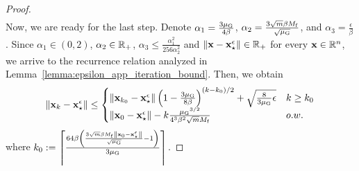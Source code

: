 \begin{proof}
\begin{align*}
\end{align*}
Now, we are ready for the last step. Denote $\alpha_1 = \frac{3{\mu_{\mathrm{G}}}}{4\beta}$, $\alpha_2 = \frac{3\sqrt{m}\beta M_{\mathrm{f}}}{\sqrt{{\mu_{\mathrm{G}}}}}$, and $\alpha_3 = \frac{\epsilon}{\beta}$. Since $\alpha_1 \in (0,2)$, $\alpha_2 \in \mathbb{R}_+$, $\alpha_3 \leq \frac{\alpha_1^2}{256\alpha^2_2}$ and $\left\Vert{\mathbf{x}}-{{\mathbf{x}}_\star^\epsilon}\right\Vert \in \mathbb{R}_+$ for every ${\mathbf{x}} \in \mathbb{R}^n$, we arrive to the recurrence relation analyzed in Lemma~\ref{lemma:epsilon_app_iteration_bound}. Then, we obtain
    \begin{align*}
        \left\Vert{\mathbf{x}}_{k} - {{\mathbf{x}}_\star^\epsilon}\right\Vert \leq 
        \begin{cases}
            \left\Vert{\mathbf{x}}_{k_0} - {{\mathbf{x}}_\star^\epsilon}\right\Vert \left(1-\frac{3{\mu_{\mathrm{G}}}}{8\beta}\right)^{(k-k_0)/2} + \sqrt{\frac{8  }{ 3 {\mu_{\mathrm{G}}}}\epsilon} & k\geq k_0\\
            \left\Vert{\mathbf{x}}_0 - {{\mathbf{x}}_\star^\epsilon}\right\Vert- k \frac{{\mu_{\mathrm{G}}}^{3/2}}{4^3 \beta^2 \sqrt{m} M_{\mathrm{f}}} & o.w.
        \end{cases}
    \end{align*}
where $k_0 := \left\lceil \frac{64 \beta  \left(\frac{3 \sqrt{m}\beta M_{\mathrm{f}} \left\Vert{\mathbf{x}}_0 - {{\mathbf{x}}_\star^\epsilon}\right\Vert }{\sqrt{{\mu_{\mathrm{G}}}}}-1\right) }{ 3{\mu_{\mathrm{G}}}}\right\rceil$.
\end{proof}

